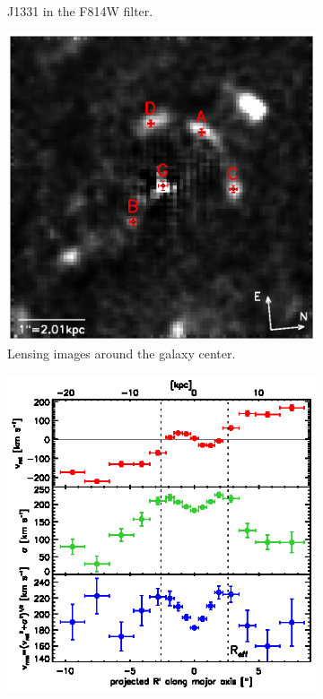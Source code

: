 \documentclass[useAMS,usenatbib]{mnras}
\begin{document}
\begin{figure}
\begin{subfigure}{.5\textwidth}
  \caption{J1331 in the F814W filter.}
  \label{fig:F814W}
\end{subfigure}
\begin{subfigure}{.5\textwidth}
  \centering
  \includegraphics[width=.9\linewidth]{lens_imgpos.ps}
  \caption{Lensing images around the galaxy center.}
  \label{fig:lens_just_imgpos}
\end{subfigure}%
\begin{subfigure}{.5\textwidth}
  \centering
  \includegraphics[width=.9\linewidth]{stellar_kinematics_data.ps}

\end{subfigure}
\end{figure}
\end{document}
